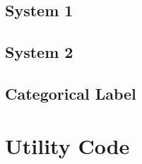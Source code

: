 \subsection{System 1}
\label{appA:ts_1}


\subsection{System 2}
\label{appA:ts_2}


\subsection{Categorical Label}
\label{appA:ts_4}


%
%
%

\section{Utility Code}
\label{appA:utility}


